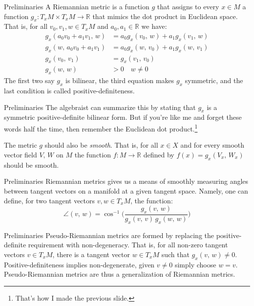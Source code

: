 \documentclass{beamer}
\begin{document}
    \begin{frame}{Preliminaries}
        A Riemannian metric is a function $g$ that assigns to every
        $x\in{M}$ a function $g_{x}:T_{x}M\times{T}_{x}M\rightarrow\mathbb{R}$
        that mimics the dot product in Euclidean space. That is, for all
        $v_{0},v_{1},w\in{T}_{x}M$ and $a_{0},a_{1}\in\mathbb{R}$ we have:
        \begin{align}
            g_{x}(a_{0}v_{0}+a_{1}v_{1},\,w)&=a_{0}g_{x}(v_{0},\,w)
                +a_{1}g_{x}(v_{1},\,w)\\
                g_{x}(w,\,a_{0}v_{0}+a_{1}v_{1})
            &=a_{0}g_{x}(w,\,v_{0})+a_{1}g_{x}(w,\,v_{1})\\
                g_{x}(v_{0},\,v_{1})&=g_{x}(v_{1},\,v_{0})\\
                g_{x}(w,\,w)&>{0}\quad{w}\ne{0}
        \end{align}
        The first two say $g_{x}$ is bilinear, the third equation makes $g_{x}$
        symmetric, and the last condition is called
        positive-definiteness.
    \end{frame}
    \begin{frame}{Preliminaries}
	    The algebraist can summarize this by stating that
        $g_{x}$ is a symmetric positive-definite bilinear form. But if you're
        like me and forget these words half the time, then remember the
        Euclidean dot product.\footnote{That's how I made the previous slide.}
        \par\hfill\par
    	The metric $g$ should also be \textit{smooth}. That is, for all
    	$x\in{X}$ and for every smooth vector field $V,\,W$ on $M$ the function
    	$f:M\rightarrow\mathbb{R}$ defined by $f(x)=g_{x}(V_{x},\,W_{x})$
    	should be smooth.
    \end{frame}
    \begin{frame}{Preliminaries}
        Riemannian metrics gives us a means of smoothly measuring angles
        between tangent vectors on a manifold at a given tangent space. Namely,
        one can define, for two tangent vectors $v,w\in{T}_{x}M$, the function:
        \begin{equation}
            \angle(v,\,w)=\cos^{-1}\Big(
                \frac{g_{x}(v,\,w)}{g_{x}(v,\,v)\,g_{x}(w,\,w)}
            \Big)
        \end{equation}
    \end{frame}
    \begin{frame}{Preliminaries}
        Pseudo-Riemannian metrics are formed by replacing the
        positive-definite requirement with non-degeneracy. That is, for all
        non-zero tangent vectors $v\in{T}_{x}M$, there is a tangent vector
        $w\in{T}_{x}M$ such that $g_{x}(v,\,w)\ne{0}$. Positive-definiteness
        implies non-degenerate, given $v\ne{0}$ simply choose $w=v$.
        Pseudo-Riemannian metrics are thus a generalization of Riemannian
        metrics.
    \end{frame}
\end{document}
